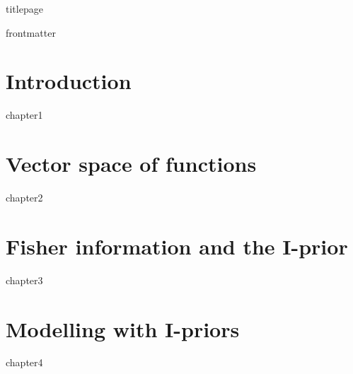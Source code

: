 \documentclass[11pt,twoside,openright]{report}
\begin{document}
{titlepage}

\setcounter{page}{2}
\cleardoublepage  %
{frontmatter}

\hTOCandLists
\clearpage


\chapter{Introduction} 
{chapter1}

\chapter{Vector space of functions}
{chapter2}

\chapter{Fisher information and the I-prior}
{chapter3}

\chapter{Modelling with I-priors}
{chapter4}
\end{document}
